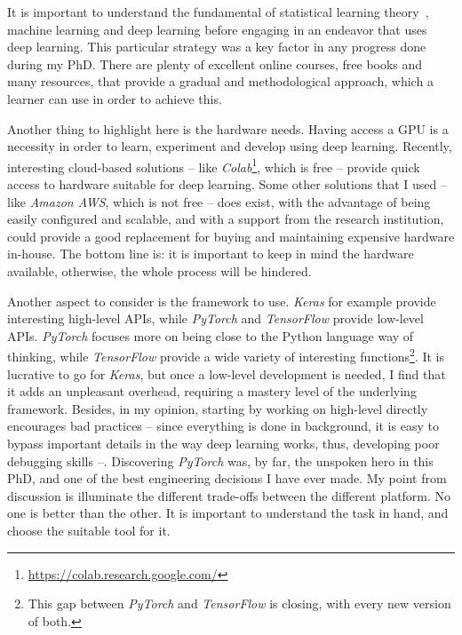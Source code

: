     \par It is important to understand the fundamental of statistical learning theory~\citep{hastie01statisticallearning}, machine learning and deep learning before engaging in an endeavor that uses deep learning. This particular strategy was a key factor in any progress done during my PhD. There are plenty of excellent online courses, free books and many resources, that provide a gradual and methodological approach, which a learner can use in order to achieve this.

    \par Another thing to highlight here is the hardware needs. Having access a GPU is a necessity in order to learn, experiment and develop using deep learning. Recently, interesting cloud-based solutions -- like \textit{Colab}\footnote{\url{https://colab.research.google.com/}}, which is free -- provide quick access to hardware suitable for deep learning. Some other solutions that I used -- like \textit{Amazon AWS}, which is not free -- does exist, with the advantage of being easily configured and scalable, and with a support from the research institution, could provide a good replacement for buying and maintaining expensive hardware in-house. The bottom line is: it is important to keep in mind the hardware available, otherwise, the whole process will be hindered.

    \par Another aspect to consider is the framework to use. \textit{Keras} for example provide interesting high-level APIs, while \textit{PyTorch} and \textit{TensorFlow} provide low-level APIs. \textit{PyTorch} focuses more on being close to the Python language way of thinking, while \textit{TensorFlow} provide a wide variety of interesting functions\footnote{This gap between \textit{PyTorch} and \textit{TensorFlow} is closing, with every new version of both.}. It is lucrative to go for \textit{Keras}, but once a low-level development is needed, I find that it adds an unpleasant overhead, requiring a mastery level of the underlying framework. Besides, in my opinion, starting by working on high-level directly encourages bad practices -- since everything is done in background, it is easy to bypass important details in the way deep learning works, thus, developing poor debugging skills --. Discovering \textit{PyTorch} was, by far, the unspoken hero in this PhD, and one of the best engineering decisions I have ever made. My point from discussion is illuminate the different trade-offs between the different platform. No one is better than the other. It is important to understand the task in hand, and choose the suitable tool for it.

